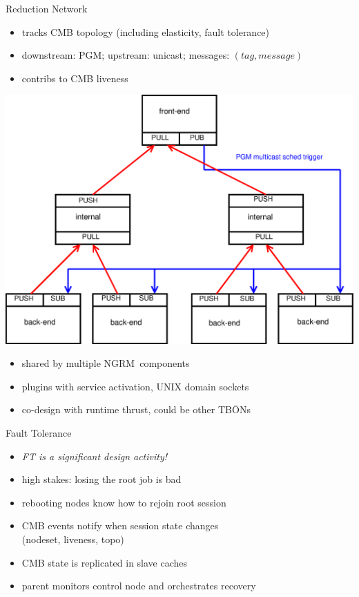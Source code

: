\documentclass[default,pdf,colorBG,slideColor]{prosper}
\newcommand{\ngrm}{NGRM}
\begin{document}
\begin{slide}{Reduction Network}{\small
\begin{minipage}{0.50\textwidth}
\begin{itemize}
  \item{tracks CMB topology (including elasticity, fault tolerance)}
  \item{downstream: PGM; upstream: unicast; messages: $(tag, message)$}
  \item{contribs to CMB liveness}
\end{itemize}
\vspace{0.10mm}
\end{minipage}
\begin{minipage}{0.40\textwidth}
\begin{center}
\includegraphics[scale=0.20]{comms_zmq_reduct}
\end{center}
\end{minipage}
\begin{itemize}
  \item{shared by multiple \ngrm\ components}
  \item{plugins with service activation, UNIX domain sockets}
  \item{co-design with runtime thrust, could be other TB\={O}Ns}
\end{itemize}
}\end{slide}
\begin{slide}{Fault Tolerance}{\small
\begin{itemize}
  \item{{\em FT is a significant design activity!}}
  \item{high stakes: losing the root job is bad}
  \item{rebooting nodes know how to rejoin root session}
  \item{CMB events notify when session state changes\\
	(nodeset, liveness, topo)}
  \item{CMB state is replicated in slave caches}
  \item{parent monitors control node and orchestrates recovery}
\end{itemize}
}\end{slide}
\end{document}
